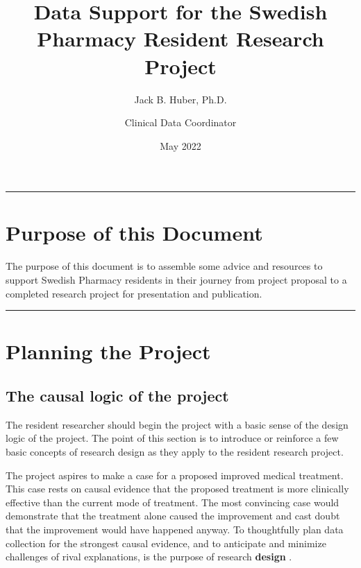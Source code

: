 \documentclass[
]{report}
\title{Data Support for the Swedish Pharmacy Resident Research Project}
\author{Jack B. Huber, Ph.D. \and Clinical Data Coordinator}
\date{May 2022}
\begin{document}
\maketitle

\begin{center}\rule{0.5\linewidth}{0.5pt}\end{center}

\hypertarget{purpose-of-this-document}{%
\chapter{Purpose of this Document}\label{purpose-of-this-document}}

The purpose of this document is to assemble some advice and resources to
support Swedish Pharmacy residents in their journey from project
proposal to a completed research project for presentation and
publication.

\begin{center}\rule{0.5\linewidth}{0.5pt}\end{center}

\hypertarget{planning-the-project}{%
\chapter{Planning the Project}\label{planning-the-project}}

\hypertarget{the-causal-logic-of-the-project}{%
\section{The causal logic of the
project}\label{the-causal-logic-of-the-project}}

The resident researcher should begin the project with a basic sense of
the design logic of the project. The point of this section is to
introduce or reinforce a few basic concepts of research design as they
apply to the resident research project.

The project aspires to make a case for a proposed improved medical
treatment. This case rests on causal evidence that the proposed
treatment is more clinically effective than the current mode of
treatment. The most convincing case would demonstrate that the treatment
alone caused the improvement and cast doubt that the improvement would
have happened anyway. To thoughtfully plan data collection for the
strongest causal evidence, and to anticipate and minimize challenges of
rival explanations, is the purpose of research \textbf{design}
\citep{CampbellStanley1963}.
\end{document}
